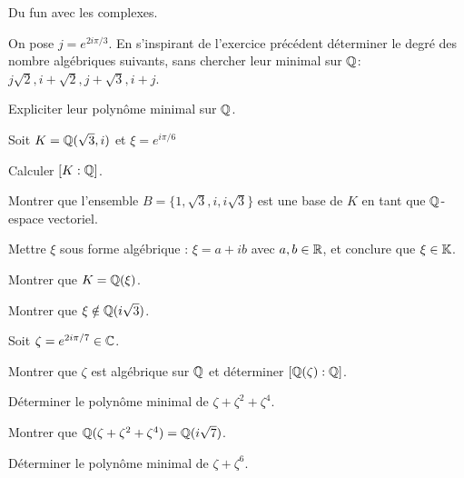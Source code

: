 \documentclass[french]{report}
\begin{document}
\begin{exo}
    Du fun avec les complexes.
    \begin{q}{1}
        On pose \(j=e^{2i\pi/3}\). En s'inspirant de l'exercice précédent déterminer
        le degré des nombre algébriques suivants, sans chercher leur minimal sur \(\mathbb{Q}\):
        \(j\sqrt{2}, i+\sqrt{2}, j+\sqrt{3}, i+j\).
    \end{q}
    \begin{q}{2}
        Expliciter leur polynôme minimal sur \(\mathbb{Q}\).
    \end{q}
\end{exo}

\begin{exo}
    Soit \(K=\mathbb{Q}(\sqrt{3}, i)\) et \(\xi=e^{i\pi/6}\)
    \begin{q}{1}
        Calculer \([K:\mathbb{Q}]\).
    \end{q}
    \begin{q}{2}
        Montrer que l'ensemble \(B=\{1,\sqrt{3}, i, i\sqrt{3}\}\) est une base de \(K\)
        en tant que \(\mathbb{Q}\)-espace vectoriel.
    \end{q}
    \begin{q}{3}
        Mettre \(\xi\) sous forme algébrique : \(\xi=a+ib\) avec \(a,b\in\mathbb{R}\), et conclure
        que \(\xi\in\mathbb{K}\).
    \end{q}
    \begin{q}{4}
        Montrer que \(K=\mathbb{Q}(\xi)\).
    \end{q}
    \begin{q}{5}
        Montrer que \(\xi\notin\mathbb{Q}(i\sqrt{3})\).
    \end{q}
\end{exo}

\begin{exo}
    Soit \(\zeta=e^{2i\pi/7}\in\mathbb{C}\).
    \begin{q}{1}
        Montrer que \(\zeta\) est algébrique sur \(\mathbb{Q}\) et déterminer \([\mathbb{Q}(\zeta):\mathbb{Q}]\).
    \end{q}
    \begin{q}{2}
        Déterminer le polynôme minimal de \(\zeta+\zeta^2+\zeta^4\).
    \end{q}
    \begin{q}{3}
        Montrer que \(\mathbb{Q}(\zeta+\zeta^2+\zeta^4)=\mathbb{Q}(i\sqrt{7})\).
    \end{q}
    \begin{q}{4}
        Déterminer le polynôme minimal de \(\zeta+\zeta^6\).
    \end{q}
\end{exo}
\end{document}

